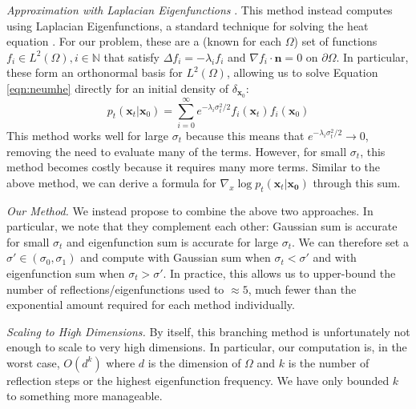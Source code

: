 \documentclass{article}
\theoremstyle{plain}
\theoremstyle{definition}
\theoremstyle{remark}
\newcommand{\grad}{\nabla}
\renewcommand{\vec}{\mathbf}
\begin{document}
\textit{Approximation with Laplacian Eigenfunctions} \citep{Bortoli2022RiemannianSG}. This method instead computes using Laplacian Eigenfunctions, a standard technique for solving the heat equation \citep{evans10}. For our problem, these are a (known for each $\Omega$) set of functions $f_i \in L^2(\Omega), i \in \mathbb{N}$ that satisfy $\Delta f_i = -\lambda_i f_i$ and $\grad f_i \cdot \vec{n} = 0$ on $\partial \Omega$. In particular, these form an orthonormal basis for $L^2(\Omega)$, allowing us to solve Equation \ref{eqn:neumhe} directly for an initial density of $\delta_{\vec{x}_0}$:
\begin{equation}
    p_t(\vec{x}_t | \vec{x}_0) = \sum_{i = 0}^\infty e^{-\lambda_i \sigma_t^2 / 2} f_i(\vec{x}_t) f_i(\vec{x}_0)
\end{equation}
This method works well for large $\sigma_t$ because this means that $e^{-\lambda_i \sigma_t^2 / 2} \to 0$, removing the need to evaluate many of the terms. However, for small $\sigma_t$, this method becomes costly because it requires many more terms. Similar to the above method, we can derive a formula for $\grad_x \log p_t(\vec{x}_t | \vec{x_0})$ through this sum.

\textit{Our Method.} We instead propose to combine the above two approaches. In particular, we note that they complement each other: Gaussian sum is accurate for small $\sigma_t$ and eigenfunction sum is accurate for large $\sigma_t$. We can therefore set a $\sigma' \in (\sigma_0, \sigma_1)$ and compute with Gaussian sum when $\sigma_t < \sigma'$ and with eigenfunction sum when $\sigma_t > \sigma'$. In practice, this allows us to upper-bound the number of reflections/eigenfunctions used to $\approx 5$, much fewer than the exponential amount required for each method individually. 

\textit{Scaling to High Dimensions.} By itself, this branching method is unfortunately not enough to scale to very high dimensions. In particular, our computation is, in the worst case, $O(d^k)$ where $d$ is the dimension of $\Omega$ and $k$ is the number of reflection steps or the highest eigenfunction frequency. We have only bounded $k$ to something more manageable. 
\end{document}
